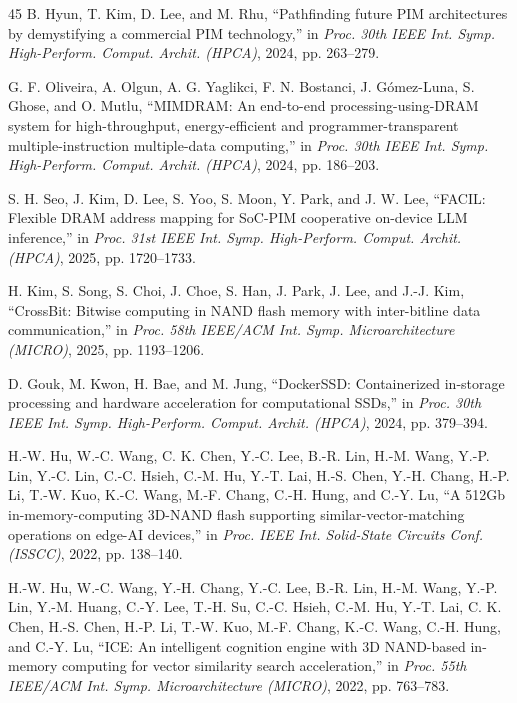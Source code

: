 \begin{thebibliography}{45}
B. Hyun, T. Kim, D. Lee, and M. Rhu, ``Pathfinding future PIM architectures by demystifying a commercial PIM technology,'' in \emph{Proc. 30th IEEE Int. Symp. High-Perform. Comput. Archit. (HPCA)}, 2024, pp. 263--279.

G. F. Oliveira, A. Olgun, A. G. Yaglikci, F. N. Bostanci, J. G\'omez-Luna, S. Ghose, and O. Mutlu, ``MIMDRAM: An end-to-end processing-using-DRAM system for high-throughput, energy-efficient and programmer-transparent multiple-instruction multiple-data computing,'' in \emph{Proc. 30th IEEE Int. Symp. High-Perform. Comput. Archit. (HPCA)}, 2024, pp. 186--203.

S. H. Seo, J. Kim, D. Lee, S. Yoo, S. Moon, Y. Park, and J. W. Lee, ``FACIL: Flexible DRAM address mapping for SoC-PIM cooperative on-device LLM inference,'' in \emph{Proc. 31st IEEE Int. Symp. High-Perform. Comput. Archit. (HPCA)}, 2025, pp. 1720--1733.

H. Kim, S. Song, S. Choi, J. Choe, S. Han, J. Park, J. Lee, and J.-J. Kim, ``CrossBit: Bitwise computing in NAND flash memory with inter-bitline data communication,'' in \emph{Proc. 58th IEEE/ACM Int. Symp. Microarchitecture (MICRO)}, 2025, pp. 1193--1206.

D. Gouk, M. Kwon, H. Bae, and M. Jung, ``DockerSSD: Containerized in-storage processing and hardware acceleration for computational SSDs,'' in \emph{Proc. 30th IEEE Int. Symp. High-Perform. Comput. Archit. (HPCA)}, 2024, pp. 379--394.

H.-W. Hu, W.-C. Wang, C. K. Chen, Y.-C. Lee, B.-R. Lin, H.-M. Wang, Y.-P. Lin, Y.-C. Lin, C.-C. Hsieh, C.-M. Hu, Y.-T. Lai, H.-S. Chen, Y.-H. Chang, H.-P. Li, T.-W. Kuo, K.-C. Wang, M.-F. Chang, C.-H. Hung, and C.-Y. Lu, ``A 512Gb in-memory-computing 3D-NAND flash supporting similar-vector-matching operations on edge-AI devices,'' in \emph{Proc. IEEE Int. Solid-State Circuits Conf. (ISSCC)}, 2022, pp. 138--140.

H.-W. Hu, W.-C. Wang, Y.-H. Chang, Y.-C. Lee, B.-R. Lin, H.-M. Wang, Y.-P. Lin, Y.-M. Huang, C.-Y. Lee, T.-H. Su, C.-C. Hsieh, C.-M. Hu, Y.-T. Lai, C. K. Chen, H.-S. Chen, H.-P. Li, T.-W. Kuo, M.-F. Chang, K.-C. Wang, C.-H. Hung, and C.-Y. Lu, ``ICE: An intelligent cognition engine with 3D NAND-based in-memory computing for vector similarity search acceleration,'' in \emph{Proc. 55th IEEE/ACM Int. Symp. Microarchitecture (MICRO)}, 2022, pp. 763--783.
\end{thebibliography}
